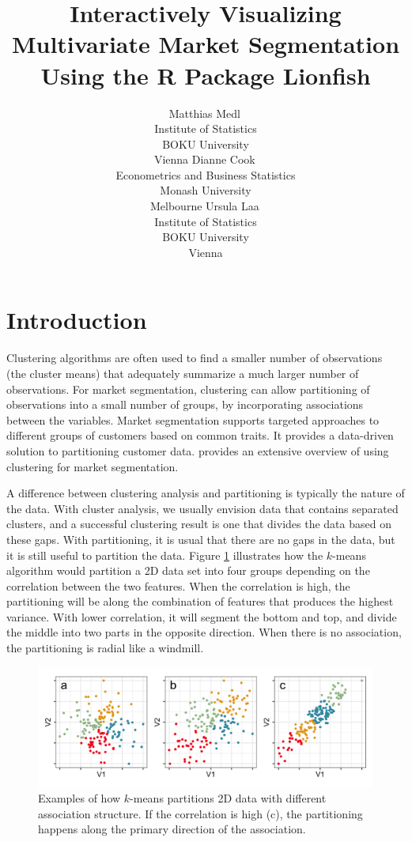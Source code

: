 \documentclass[article]{ajs}
\author{Matthias Medl\,\orcidlink{0000-0002-3354-4579}\\ Institute of Statistics \\ BOKU University \\ Vienna \And 
        Dianne Cook\,\orcidlink{0000-0002-3813-7155}\\ Econometrics and Business Statistics \\ Monash University \\ Melbourne \And
        Ursula Laa\,\orcidlink{0000-0002-0249-6439}\\ Institute of Statistics \\ BOKU University \\ Vienna}
\title{Interactively Visualizing Multivariate Market Segmentation Using the R Package Lionfish}
\begin{document}
\section{Introduction}

Clustering algorithms are often used to find a smaller number of observations (the cluster means) that adequately summarize a much larger number of observations. For market segmentation, clustering can allow partitioning of observations into a small number of groups, by incorporating associations between the variables. Market segmentation supports targeted approaches to different groups of customers based on common traits. It provides a data-driven solution to partitioning customer data. \cite{leisch2018market} provides an extensive overview of using clustering for market segmentation. 

A difference between clustering analysis and partitioning is typically the nature of the data. With cluster analysis, we usually envision data that contains separated clusters, and a successful clustering result is one that divides the data based on these gaps. With partitioning, it is usual that there are no gaps in the data, but it is still useful to partition the data. Figure \ref{kmeans-partition} illustrates how the $k$-means algorithm would partition a 2D data set into four groups depending on the correlation between the two features. When the correlation is high, the partitioning will be along the combination of features that produces the highest variance. With lower correlation, it will segment the bottom and top, and divide the middle into two parts in the opposite direction. When there is no association, the partitioning is radial like a windmill.

\begin{figure}[ht]
\centerline{\includegraphics[width=1\textwidth]{images/intro1.png}}
\caption{Examples of how $k$-means partitions 2D data with different association structure. If the correlation is high (c), the partitioning happens along the primary direction of the association.}
\label{kmeans-partition}
\end{figure}
\end{document}
